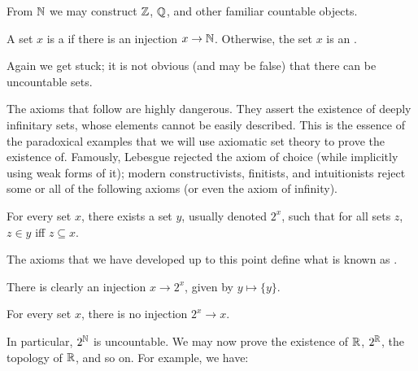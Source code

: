 \begin{subsec}
From $\mathbb{N}$ we may construct $\mathbb{Z}$, $\mathbb{Q}$, and other familiar countable objects.
\end{subsec}

\begin{definition}
A set $x$ is a  if there is an injection $x \to \mathbb{N}$.
Otherwise, the set $x$ is an .
\end{definition}

\begin{subsec}
Again we get stuck; it is not obvious (and may be false) that there can be uncountable sets.
\end{subsec}

\begin{subsec}
The axioms that follow are highly dangerous. They assert the existence of deeply infinitary sets, whose elements cannot be easily described.
This is the essence of the paradoxical examples that we will use axiomatic set theory to prove the existence of.
Famously, Lebesgue rejected the axiom of choice (while implicitly using weak forms of it); modern constructivists, finitists, and intuitionists reject some or all of the following axioms (or even the axiom of infinity).
\end{subsec}

\begin{axiom}
For every set $x$, there exists a set $y$, usually denoted $2^{x}$, such that for all sets $z$, $z \in y$ iff $z \subseteq x$.
\end{axiom}

\begin{subsec}
The axioms that we have developed up to this point define what is known as .
\end{subsec}

\begin{subsec}
There is clearly an injection $x \to 2^{x}$, given by $y \mapsto \{y\}$.
\end{subsec}

\begin{theorem}
For every set $x$, there is no injection $2^{x} \to x$.
\end{theorem}

\begin{subsec}
In particular, $2^{\mathbb{N}}$ is uncountable.
We may now prove the existence of $\mathbb{R}$, $2^{\mathbb{R}}$, the topology of $\mathbb{R}$, and so on. For example, we have:
\end{subsec}


